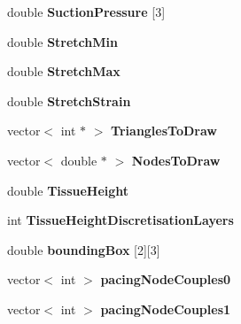 \begin{DoxyCompactItemize}
\item 
\hypertarget{classSimulation_aa7b121f145af33dae88b463490aef709}{}double {\bfseries Suction\+Pressure} \mbox{[}3\mbox{]}\label{classSimulation_aa7b121f145af33dae88b463490aef709}

\item 
\hypertarget{classSimulation_a579d17e790d3ea2e470db00e3a732e0c}{}double {\bfseries Stretch\+Min}\label{classSimulation_a579d17e790d3ea2e470db00e3a732e0c}

\item 
\hypertarget{classSimulation_a53227db1a41449ba235979fdd052f42e}{}double {\bfseries Stretch\+Max}\label{classSimulation_a53227db1a41449ba235979fdd052f42e}

\item 
\hypertarget{classSimulation_a76aca0fc8a6de8550af15556d18e6dfb}{}double {\bfseries Stretch\+Strain}\label{classSimulation_a76aca0fc8a6de8550af15556d18e6dfb}

\item 
\hypertarget{classSimulation_aaffbf9ee13e071aa1cdc8e75a0d79774}{}vector$<$ int $\ast$ $>$ {\bfseries Triangles\+To\+Draw}\label{classSimulation_aaffbf9ee13e071aa1cdc8e75a0d79774}

\item 
\hypertarget{classSimulation_aa08434e5c71b265f87aab46be36438be}{}vector$<$ double $\ast$ $>$ {\bfseries Nodes\+To\+Draw}\label{classSimulation_aa08434e5c71b265f87aab46be36438be}

\item 
\hypertarget{classSimulation_adad1e5ce0657d347c8b46a4d1749caa3}{}double {\bfseries Tissue\+Height}\label{classSimulation_adad1e5ce0657d347c8b46a4d1749caa3}

\item 
\hypertarget{classSimulation_aafb36172155cdd675fb7d8cbe057c0ab}{}int {\bfseries Tissue\+Height\+Discretisation\+Layers}\label{classSimulation_aafb36172155cdd675fb7d8cbe057c0ab}

\item 
\hypertarget{classSimulation_a8e5b5de0190d35c7984c4b393fd9fcd9}{}double {\bfseries bounding\+Box} \mbox{[}2\mbox{]}\mbox{[}3\mbox{]}\label{classSimulation_a8e5b5de0190d35c7984c4b393fd9fcd9}

\item 
\hypertarget{classSimulation_a4164fd18de78e7c215d8fd34164e9f57}{}vector$<$ int $>$ {\bfseries pacing\+Node\+Couples0}\label{classSimulation_a4164fd18de78e7c215d8fd34164e9f57}

\item 
\hypertarget{classSimulation_a71301ed19ac899b1269460f355ab0d6f}{}vector$<$ int $>$ {\bfseries pacing\+Node\+Couples1}\label{classSimulation_a71301ed19ac899b1269460f355ab0d6f}


\end{DoxyCompactItemize}

